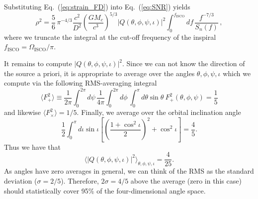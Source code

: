 \documentclass[amsmath,amssymb,aps,floats,amsfonts,notitlepage,superscriptaddress,eqsecnum,nofootinbib,10pt]{revtex4-1}
\newcommand{\f}{\frac}
\newcommand{\be}{\begin{equation}}
\newcommand{\ee}{\end{equation}}
\begin{document}
Substituting Eq.~(\ref{eq:strain_FD}) into Eq.~(\ref{eq:SNR}) yields
%
\be
\rho^2 = \f{5}{6}\, \pi^{-4/3} \f{c^2}{D^2}\left(\f{G M_c}{c^3}\right)^{5/3}|Q(\theta,\phi,\psi,\iota)|^2 \int_0^{f_\text{ISCO}} d f\, \f{f^{-7/3}}{S_n(f)}\, \label{eq:SNR_v2},
\ee
%
where we truncate the integral at the cut-off frequency of the inspiral $f_\text{ISCO}=\Omega_\text{ISCO}/\pi$.

It remains to compute $|Q(\theta,\phi,\psi,\iota)|^2$. 
Since we can not know the direction of the source a priori, it is appropriate to average over the angles $\theta,\phi,\psi,\iota$ which we compute
%
%
via the following RMS-averaging integral
%
\be
\langle F^2_{+}\rangle \equiv \f{1}{2\pi}\int_0^{2\pi}d\psi \,\f{1}{4\pi}\int_0^{2\pi} d\phi\,\int_0^\pi d\theta \sin\theta\ F^2_{+}(\theta,\phi,\psi)=\f{1}{5}\label{eq:ang_av}
\ee
%
and likewise $\langle F^2_{\times}\rangle=1/5 $.
Finally, we average over the orbital inclination angle
%
\be
\f{1}{2} \int_0^\pi d\iota\sin\iota\left[\left(\f{1+\cos^2\iota}{2}\right)^2+\cos^2\iota\right] = \f{4}{5} .\label{eq:inc_ang_av}
\ee
Thus we have that
%
\be
\langle |Q(\theta,\phi,\psi,\iota)|^2 \rangle_{\theta,\phi,\psi,\iota} = \f{4}{25}\label{eq:RMS_th_ph_ps_iota}.
\ee
%
As angles have zero averages in general, we can think of the RMS as the standard deviation ($\sigma =2/5$). 
Therefore, $2\sigma= 4/5$ above the average (zero in this case) should statistically cover 95\% of the four-dimensional angle space. 
%
%
%
%
%
\end{document}
